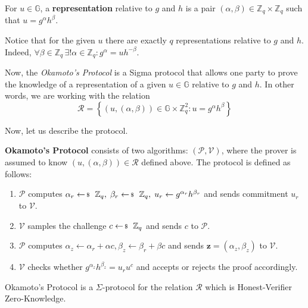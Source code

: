 \documentclass[../lecture-notes-148x210.tex]{subfiles}
\begin{document}
\begin{definition}
    For $u \in \mathbb{G}$, a \textbf{representation} relative to $g$ and $h$ is a pair $(\alpha,\beta) \in \mathbb{Z}_q \times \mathbb{Z}_q$ such that $u=g^{\alpha}h^{\beta}$.
\end{definition}

\begin{remark}
    Notice that for the given $u$ there are exactly $q$ representations relative to $g$ and $h$. Indeed, $\forall \beta \in \mathbb{Z}_q \, \exists! \alpha \in \mathbb{Z}_q: g^{\alpha} = uh^{-\beta}$. 
\end{remark}

Now, the \textit{Okamoto's Protocol} is a Sigma protocol that allows one party to prove the knowledge of a representation of a given $u \in \mathbb{G}$ relative to $g$ and $h$. In other words, we are working with the relation
\begin{equation*}
    \mathcal{R} = \left\{ (u,(\alpha,\beta)) \in \mathbb{G} \times \mathbb{Z}_q^2: u = g^{\alpha}h^{\beta} \right\}
\end{equation*}

Now, let us describe the protocol.

\begin{definition}
    \textbf{Okamoto's Protocol} consists of two algorithms: $(\mathcal{P}, \mathcal{V})$, where the prover is assumed to know $(u,(\alpha,\beta)) \in \mathcal{R}$ defined above. The protocol is defined as follows:
    \begin{enumerate}
        \item $\mathcal{P}$ computes $\alpha_r \leftarrowS \mathbb{Z}_q, \; \beta_r \leftarrowS \mathbb{Z}_q, \; u_r \gets g^{\alpha_r}h^{\beta_r}$ and sends commitment $u_r$ to $\mathcal{V}$.
        \item $\mathcal{V}$ samples the challenge $c \leftarrowS \mathbb{Z}_q$ and sends $c$ to $\mathcal{P}$.
        \item $\mathcal{P}$ computes $\alpha_z \gets \alpha_r + \alpha c, \beta_z \gets \beta_r + \beta c$ and sends $\mathbf{z} = (\alpha_z,\beta_z)$ to $\mathcal{V}$.
        \item $\mathcal{V}$ checks whether $g^{\alpha_z}h^{\beta_z} = u_r u^c$ and accepts or rejects the proof accordingly.
    \end{enumerate}
\end{definition}

\begin{theorem}
    Okamoto's Protocol is a $\Sigma$-protocol for the relation $\mathcal{R}$ which is Honest-Verifier Zero-Knowledge.
\end{theorem}
\end{document}
